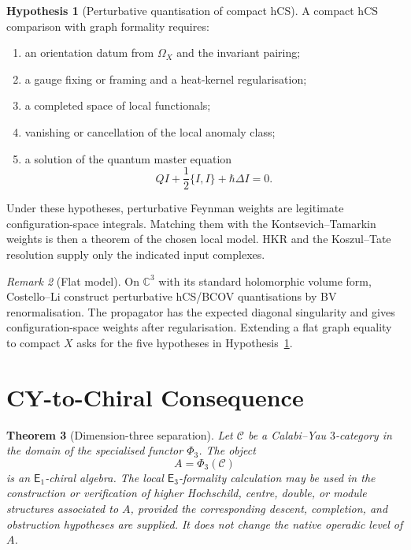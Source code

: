 \documentclass[11pt]{amsart}
\newtheorem{theorem}{Theorem}[section]
\theoremstyle{definition}
\newtheorem{hypothesis}[theorem]{Hypothesis}
\theoremstyle{remark}
\newtheorem{remark}[theorem]{Remark}
\providecommand{\Eone}{\mathsf{E}_1}
\providecommand{\Ethree}{\mathsf{E}_3}
\providecommand{\cC}{\mathcal{C}}
\providecommand{\CC}{\mathbb{C}}
\begin{document}
\begin{hypothesis}[Perturbative quantisation of compact hCS]
\label{hyp:hcs-qme}
A compact hCS comparison with graph formality requires:
\begin{enumerate}
\item an orientation datum from \(\Omega_X\) and the invariant pairing;
\item a gauge fixing or framing and a heat-kernel regularisation;
\item a completed space of local functionals;
\item vanishing or cancellation of the local anomaly class;
\item a solution of the quantum master equation
\[
  QI+\frac12\{I,I\}+\hbar\Delta I=0.
\]
\end{enumerate}
Under these hypotheses, perturbative Feynman weights are legitimate
configuration-space integrals.  Matching them with the
Kontsevich--Tamarkin weights is then a theorem of the chosen local
model.  HKR and the Koszul--Tate resolution supply only the indicated
input complexes.
\end{hypothesis}

\begin{remark}[Flat model]
\label{rem:flat-hcs}
On \(\CC^3\) with its standard holomorphic volume form, Costello--Li
construct perturbative hCS/BCOV quantisations by BV renormalisation.
The propagator has the expected diagonal singularity and gives
configuration-space weights after regularisation.  Extending a flat
graph equality to compact \(X\) asks for the five hypotheses in
Hypothesis~\ref{hyp:hcs-qme}.
\end{remark}

\section{CY-to-Chiral Consequence}
\label{sec:cy-to-chiral-consequence}

\begin{theorem}[Dimension-three separation]
\label{thm:d3-separation}
Let \(\cC\) be a Calabi--Yau \(3\)-category in the domain of the
specialised functor \(\Phi_3\).  The object
\[
  A=\Phi_3(\cC)
\]
is an \(\Eone\)-chiral algebra.  The local \(\Ethree\)-formality
calculation may be used in the construction or verification of higher
Hochschild, centre, double, or module structures associated to \(A\),
provided the corresponding descent, completion, and obstruction
hypotheses are supplied.  It does not change the native operadic level
of \(A\).
\end{theorem}
\end{document}
